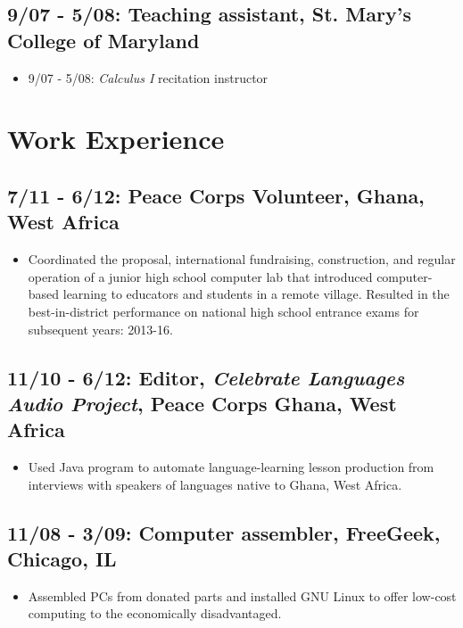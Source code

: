 \documentclass[11pt]{cv}
\begin{document}
\subsection*{9/07 - 5/08: Teaching assistant, St. Mary's College of Maryland}
\label{sec:orgabcf682}
\begin{itemize}
\item 9/07 - 5/08: \emph{Calculus I} recitation instructor\\
\end{itemize}
\section*{Work Experience}
\label{sec:org24eece8}
\subsection*{7/11 - 6/12: Peace Corps Volunteer, Ghana, West Africa}
\label{sec:org849558f}
\begin{itemize}
\item Coordinated the proposal, international fundraising, construction, and regular operation of a junior high school computer lab that introduced computer-based learning to educators and students in a remote village. Resulted in the best-in-district performance on national high school entrance exams for subsequent years: 2013-16.\\
\end{itemize}
\subsection*{11/10 - 6/12: Editor, \emph{Celebrate Languages Audio Project}, Peace Corps Ghana, West Africa}
\label{sec:org0db88f8}
\begin{itemize}
\item Used Java program to automate language-learning lesson production from interviews with speakers of languages native to Ghana, West Africa.\\
\end{itemize}
\subsection*{11/08 - 3/09: Computer assembler, FreeGeek, Chicago, IL}
\label{sec:orge87e890}
\begin{itemize}
\item Assembled PCs from donated parts and installed GNU Linux to offer low-cost computing to the economically disadvantaged.\\
\end{itemize}
\end{document}
